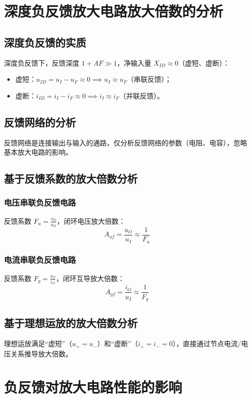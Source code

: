 \section{深度负反馈放大电路放大倍数的分析}
\subsection{深度负反馈的实质}
深度负反馈下，反馈深度 $1 + AF \gg 1$，净输入量 $X_{ID} \approx 0$（虚短、虚断）：
\begin{itemize}
    \item 虚短：$u_{ID} = u_I - u_F \approx 0 \implies u_I \approx u_F$（串联反馈）；
    \item 虚断：$i_{ID} = i_I - i_F \approx 0 \implies i_I \approx i_F$（并联反馈）。
\end{itemize}

\subsection{反馈网络的分析}
反馈网络是连接输出与输入的通路，仅分析反馈网络的参数（电阻、电容），忽略基本放大电路的影响。

\subsection{基于反馈系数的放大倍数分析}
\subsubsection{电压串联负反馈电路}
反馈系数 $F_u = \frac{u_F}{u_O}$，闭环电压放大倍数：
\[
A_{uf} = \frac{u_O}{u_I} \approx \frac{1}{F_u}
\]

\subsubsection{电流串联负反馈电路}
反馈系数 $F_g = \frac{u_F}{i_O}$，闭环互导放大倍数：
\[
A_{gf} = \frac{i_O}{u_I} \approx \frac{1}{F_g}
\]

\subsection{基于理想运放的放大倍数分析}
理想运放满足“虚短”（$u_+ = u_-$）和“虚断”（$i_+ = i_- = 0$），直接通过节点电流/电压关系推导放大倍数。

\section{负反馈对放大电路性能的影响}

